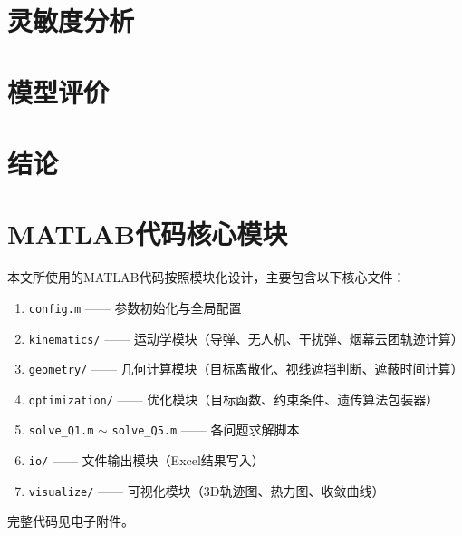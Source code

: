 \documentclass[12pt,a4paper]{ctexart}
\begin{document}
\section{灵敏度分析}


\section{模型评价}


\section{结论}


\newpage
\printbibliography[title={参考文献}]

\appendix
\section{MATLAB代码核心模块}
本文所使用的MATLAB代码按照模块化设计，主要包含以下核心文件：
\begin{enumerate}[label=\texttt{code/}]
    \item \texttt{config.m} —— 参数初始化与全局配置
    \item \texttt{kinematics/} —— 运动学模块（导弹、无人机、干扰弹、烟幕云团轨迹计算）
    \item \texttt{geometry/} —— 几何计算模块（目标离散化、视线遮挡判断、遮蔽时间计算）
    \item \texttt{optimization/} —— 优化模块（目标函数、约束条件、遗传算法包装器）
    \item \texttt{solve\_Q1.m} $\sim$ \texttt{solve\_Q5.m} —— 各问题求解脚本
    \item \texttt{io/} —— 文件输出模块（Excel结果写入）
    \item \texttt{visualize/} —— 可视化模块（3D轨迹图、热力图、收敛曲线）
\end{enumerate}

完整代码见电子附件。
\end{document}

